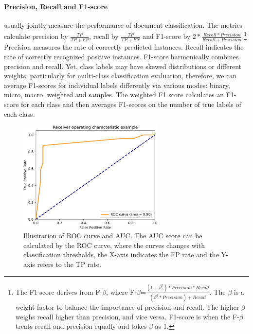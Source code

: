 \paragraph{Precision, Recall and F1-score} usually jointly measure the performance of document classification. The metrics calculate precision by $\frac{TP}{TP+FP}$, recall by $\frac{TP}{TP+FN}$ and F1-score by $2*\frac{Recall*Precision}{Recall+Precision}$.\footnote{The F1-score derives from F-$\beta$, where F-$\beta$=$\frac{(1+\beta^2)*Precision*Recall}{(\beta^2*Precision)+Recall}$. The $\beta$ is a weight factor to balance the importance of precision and recall. 
The higher $\beta$ weighs recall higher than precision, and vice versa. 
F1-score is when the F-$\beta$ treats recall and precision equally and takes $\beta$ as 1.}
Precision measures the rate of correctly predicted instances. 
Recall indicates the rate of correctly recognized positive instances. 
F1-score harmonically combines precision and recall.
Yet, class labels may have skewed distributions or different weights, particularly for multi-class classification evaluation, therefore, we can average F1-scores for individual labels differently via various modes: binary, micro, macro, weighted and samples.
The weighted F1 score calculates an F1-score for each class and then averages F1-scores on the number of true labels of each class.


\begin{figure}[tb!]
\centering
\includegraphics[width=0.65\textwidth]{images/chapter2/roc_curve.pdf}
\caption{Illustration of ROC curve and AUC. The AUC score can be calculated by the ROC curve, where the curves changes with classification thresholds, the X-axis indicates the FP rate and the Y-axis refers to the TP rate.}
\label{chap2:fig:roc}
\end{figure}

